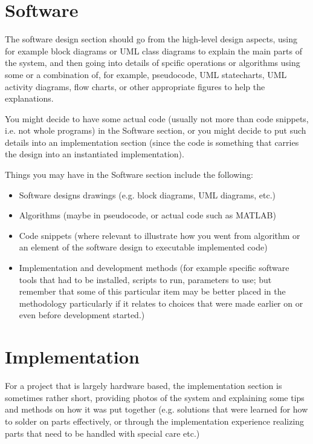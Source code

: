 
\section{Software}

The software design section should go from the high-level design aspects, using for example block diagrams or UML class diagrams to explain the main parts of the system, and then going into details of spcific operations or algorithms using some or a combination of, for example, pseudocode, UML statecharts, UML activity diagrams, flow charts, or other appropriate figures to help the explanations.

You might decide to have some actual code (usually not more than code snippets, i.e. not whole programs) in the Software section, or you might decide to put such details into an implementation section (since the code is something that carries the design into an instantiated implementation).

Things you may have in the Software section include the following:

\begin{itemize}
	\item Software designs drawings (e.g. block diagrams, UML diagrams, etc.)
	\item Algorithms (maybe in pseudocode, or actual code such as MATLAB)
	\item Code snippets (where relevant to illustrate how you went from algorithm or an element of the software design to executable implemented code)
	\item Implementation and development methods (for example specific software tools that had to be installed, scripts to run, parameters to use; but remember that some of this particular item may be better placed in the methodology particularly if it relates to choices that were made earlier on or even before development started.)
\end{itemize}

\section{Implementation}

For a project that is largely hardware based, the implementation section is sometimes rather short, providing photos of the system and explaining some tips and methods on how it was put together (e.g. solutions that were learned for how to solder on parts effectively, or through the implementation experience realizing parts that need to be handled with special care etc.)

